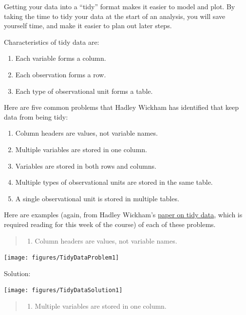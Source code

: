 \documentclass[]{book}
\providecommand{\tightlist}{%
  \setlength{\itemsep}{0pt}\setlength{\parskip}{0pt}}
\theoremstyle{definition}
\theoremstyle{definition}
\theoremstyle{definition}
\theoremstyle{remark}
\begin{document}
Getting your data into a ``tidy'' format makes it easier to model and
plot. By taking the time to tidy your data at the start of an analysis,
you will save yourself time, and make it easier to plan out later steps.

Characteristics of tidy data are:

\begin{enumerate}
\def\labelenumi{\arabic{enumi}.}
\tightlist
\item
  Each variable forms a column.
\item
  Each observation forms a row.
\item
  Each type of observational unit forms a table.
\end{enumerate}

Here are five common problems that Hadley Wickham has identified that
keep data from being tidy:

\begin{enumerate}
\def\labelenumi{\arabic{enumi}.}
\tightlist
\item
  Column headers are values, not variable names.
\item
  Multiple variables are stored in one column.
\item
  Variables are stored in both rows and columns.
\item
  Multiple types of observational units are stored in the same table.
\item
  A single observational unit is stored in multiple tables.
\end{enumerate}

Here are examples (again, from Hadley Wickham's
\href{http://vita.had.co.nz/papers/tidy-data.pdf}{paper on tidy data},
which is required reading for this week of the course) of each of these
problems.

\begin{quote}
\begin{enumerate}
\def\labelenumi{\arabic{enumi}.}
\tightlist
\item
  Column headers are values, not variable names.
\end{enumerate}
\end{quote}

\texttt{[image: figures/TidyDataProblem1]}

Solution:

\begin{center}\texttt{[image: figures/TidyDataSolution1]} \end{center}

\begin{quote}
\begin{enumerate}
\def\labelenumi{\arabic{enumi}.}
\setcounter{enumi}{1}
\tightlist
\item
  Multiple variables are stored in one column.
\end{enumerate}
\end{quote}
\end{document}
